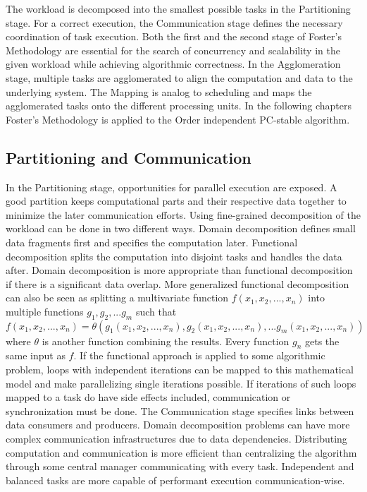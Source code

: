 The workload is decomposed into the smallest possible tasks in the Partitioning stage. For a correct execution, the Communication stage defines the necessary coordination of task execution. Both the first and the second stage of Foster's Methodology are essential for the search of concurrency and scalability in the given workload while achieving algorithmic correctness. In the Agglomeration stage, multiple tasks are agglomerated to align the computation and data to the underlying system. The Mapping is analog to scheduling and maps the agglomerated tasks onto the different processing units. In the following chapters Foster's Methodology is applied to the Order independent PC-stable algorithm.

\subsection{Partitioning and Communication}
In the Partitioning stage, opportunities for parallel execution are exposed. A good partition keeps computational parts and their respective data together to minimize the later communication efforts. Using fine-grained decomposition of the workload can be done in two different ways. Domain decomposition defines small data fragments first and specifies the computation later. Functional decomposition splits the computation into disjoint tasks and handles the data after. Domain decomposition is more appropriate than functional decomposition if there is a significant data overlap.
More generalized functional decomposition can also be seen as splitting a multivariate function $f(x_1,x_2,...,x_n)$ into multiple functions ${g_1,g_2,...g_m}$ such that $f(x_1,x_2,...,x_n) = \theta(g_1(x_1,x_2,...,x_n),g_2(x_1,x_2,...,x_n),...g_m(x_1,x_2,...,x_n))$ where $\theta$ is another function combining the results. Every function $g_n$ gets the same input as $f$. If the functional approach is applied to some algorithmic problem, loops with independent iterations can be mapped to this mathematical model and make parallelizing single iterations possible. If iterations of such loops mapped to a task do have side effects included, communication or synchronization must be done.
The Communication stage specifies links between data consumers and producers. Domain decomposition problems can have more complex communication infrastructures due to data dependencies. Distributing computation and communication is more efficient than centralizing the algorithm through some central manager communicating with every task. Independent and balanced tasks are more capable of performant execution communication-wise.

